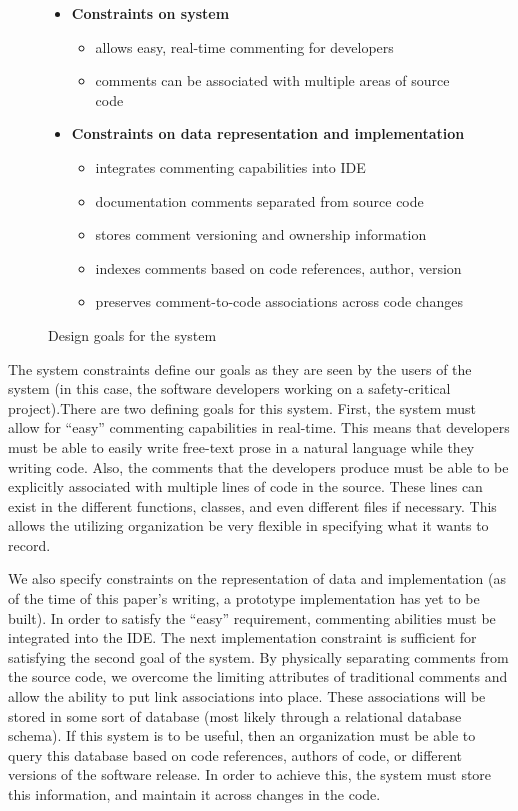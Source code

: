 \begin{figure}
\makebox[\textwidth]{\hrulefill}
\begin{itemize}
  \item \textbf{Constraints on system}
    \begin{itemize}
      \item allows easy, real-time commenting for developers
      \item comments can be associated with multiple areas of source code
    \end{itemize}
  \item \textbf{Constraints on data representation and implementation}
    \begin{itemize}
      \item integrates commenting capabilities into IDE
      \item documentation comments separated from source code
      \item stores comment versioning and ownership information
      \item indexes comments based on code references, author, version
      \item preserves comment-to-code associations across code changes
    \end{itemize}
\end{itemize}
\makebox[\textwidth]{\hrulefill}
\caption{Design goals for the system}
\label{fig:design_criteria}
\end{figure}

The system constraints define our goals as they are seen by the users of the
system (in this case, the software developers working on a safety-critical
project).There are two defining goals for this system. First, the system must
allow for ``easy'' commenting capabilities in real-time. This means that
developers must be able to easily write free-text prose in a natural language
while they writing code. Also, the comments that the developers produce must be
able to be explicitly associated with multiple lines of code in the source.
These lines can exist in the different functions, classes, and even different
files if necessary. This allows the utilizing organization be very flexible in
specifying what it wants to record.

We also specify constraints on the representation of data and implementation (as
of the time of this paper's writing, a prototype implementation has yet to be
built). In order to satisfy the ``easy'' requirement, commenting abilities must
be integrated into the IDE. The next implementation constraint is sufficient for
satisfying the second goal of the system. By physically separating comments from
the source code, we overcome the limiting attributes of traditional comments and
allow the ability to put link associations into place. These associations will
be stored in some sort of database (most likely through a relational database
schema). If this system is to be useful, then an organization must be able to
query this database based on code references, authors of code, or different
versions of the software release. In order to achieve this, the system must
store this information, and maintain it across changes in the code.


